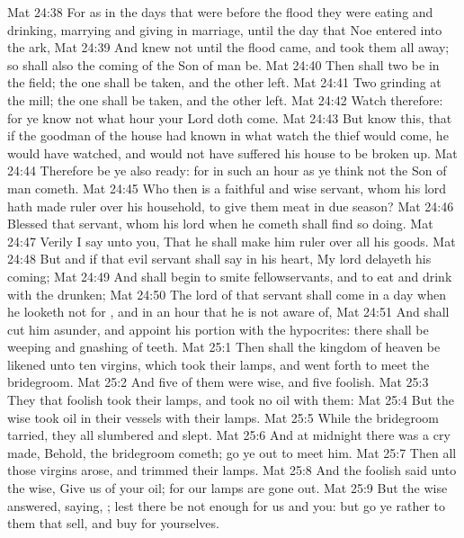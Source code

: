 \vs Mat 24:38 For as in the days that were before the flood they were eating and drinking, marrying and giving in marriage, until the day that Noe entered into the ark,
\vs Mat 24:39 And knew not until the flood came, and took them all away; so shall also the coming of the Son of man be.
\vs Mat 24:40 Then shall two be in the field; the one shall be taken, and the other left.
\vs Mat 24:41 Two  grinding at the mill; the one shall be taken, and the other left.
\vs Mat 24:42 Watch therefore: for ye know not what hour your Lord doth come.
\vs Mat 24:43 But know this, that if the goodman of the house had known in what watch the thief would come, he would have watched, and would not have suffered his house to be broken up.
\vs Mat 24:44 Therefore be ye also ready: for in such an hour as ye think not the Son of man cometh.
\vs Mat 24:45 Who then is a faithful and wise servant, whom his lord hath made ruler over his household, to give them meat in due season?
\vs Mat 24:46 Blessed  that servant, whom his lord when he cometh shall find so doing.
\vs Mat 24:47 Verily I say unto you, That he shall make him ruler over all his goods.
\vs Mat 24:48 But and if that evil servant shall say in his heart, My lord delayeth his coming;
\vs Mat 24:49 And shall begin to smite  fellowservants, and to eat and drink with the drunken;
\vs Mat 24:50 The lord of that servant shall come in a day when he looketh not for , and in an hour that he is not aware of,
\vs Mat 24:51 And shall cut him asunder, and appoint  his portion with the hypocrites: there shall be weeping and gnashing of teeth.
\vs Mat 25:1 Then shall the kingdom of heaven be likened unto ten virgins, which took their lamps, and went forth to meet the bridegroom.
\vs Mat 25:2 And five of them were wise, and five  foolish.
\vs Mat 25:3 They that  foolish took their lamps, and took no oil with them:
\vs Mat 25:4 But the wise took oil in their vessels with their lamps.
\vs Mat 25:5 While the bridegroom tarried, they all slumbered and slept.
\vs Mat 25:6 And at midnight there was a cry made, Behold, the bridegroom cometh; go ye out to meet him.
\vs Mat 25:7 Then all those virgins arose, and trimmed their lamps.
\vs Mat 25:8 And the foolish said unto the wise, Give us of your oil; for our lamps are gone out.
\vs Mat 25:9 But the wise answered, saying, ; lest there be not enough for us and you: but go ye rather to them that sell, and buy for yourselves.
